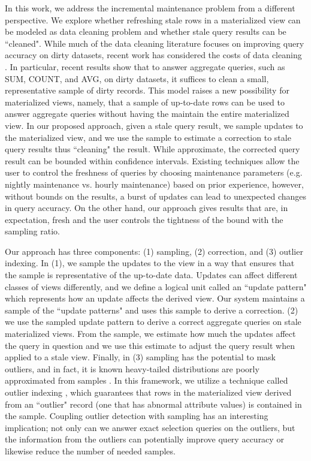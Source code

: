 In this work, we address the incremental maintenance problem from a different perspective.
We explore whether refreshing stale rows in a materialized view can be modeled as data cleaning problem and whether stale query results can be ``cleaned".
While much of the data cleaning literature focuses on improving query accuracy on dirty datasets,
recent work has considered the costs of data cleaning \cite{wang1999sample}.
In particular, recent results show that to answer aggregate queries, such as SUM, COUNT, and AVG, on dirty datasets, it suffices to clean a small, representative sample of dirty records.
This model raises a new possibility for materialized views, namely, that a sample of up-to-date rows can be used to answer aggregate queries without having the maintain the entire materialized view.
In our proposed approach, given a stale query result, we sample updates to the materialized view, and we use the sample to estimate a correction to stale query results thus ``cleaning" the result.
While approximate, the corrected query result can be bounded within confidence intervals.
Existing techniques allow the user to control the freshness of queries by choosing maintenance parameters (e.g. nightly maintenance vs. hourly maintenance) based on prior experience, however, without bounds on the results, a burst of updates can lead to unexpected changes in query accuracy.
On the other hand, our approach gives results that are, in expectation, fresh and the user controls the tightness of the bound with the sampling ratio.

Our approach has three components: (1) sampling, (2) correction, and (3) outlier indexing. In (1), we sample the updates to the view in a way that ensures that the sample is representative of the up-to-date data. Updates can affect different classes of views differently, and we define a logical unit called an ``update pattern" which represents how an update affects the derived view. Our system maintains a sample of the ``update patterns" and uses this sample to derive a correction. (2) we use the sampled update pattern to derive a correct aggregate queries on stale materialized views.
From the sample, we estimate how much the updates affect the query in question and we use this estimate to adjust the query result when applied to a stale view.
Finally, in (3) sampling has the potential to mask outliers, and in fact, it is known
heavy-tailed distributions are poorly approximated from samples \cite{chaudhuri2001overcoming}.
In this framework, we utilize a technique called outlier indexing \cite{chaudhuri2001overcoming}, which guarantees that rows in the materialized view derived from an ``outlier" record (one that has abnormal attribute values) is contained in the sample.
Coupling outlier detection with sampling has an interesting implication; not only can we answer exact selection queries on the outliers, but
the information from the outliers can potentially improve query accuracy or likewise reduce the number of needed samples.

